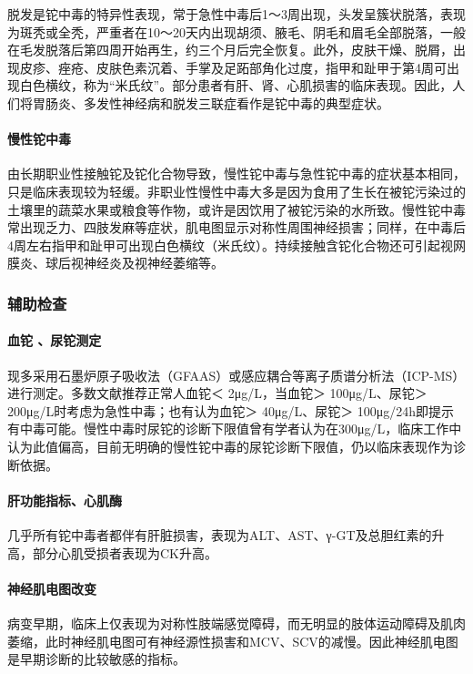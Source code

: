 脱发是铊中毒的特异性表现，常于急性中毒后1～3周出现，头发呈簇状脱落，表现为斑秃或全秃，严重者在10～20天内出现胡须、腋毛、阴毛和眉毛全部脱落，一般在毛发脱落后第四周开始再生，约三个月后完全恢复。此外，皮肤干燥、脱屑，出现皮疹、痤疮、皮肤色素沉着、手掌及足跖部角化过度，指甲和趾甲于第4周可出现白色横纹，称为“米氏纹”。部分患者有肝、肾、心肌损害的临床表现。因此，人们将胃肠炎、多发性神经病和脱发三联症看作是铊中毒的典型症状。

\paragraph{慢性铊中毒}

由长期职业性接触铊及铊化合物导致，慢性铊中毒与急性铊中毒的症状基本相同，只是临床表现较为轻缓。非职业性慢性中毒大多是因为食用了生长在被铊污染过的土壤里的蔬菜水果或粮食等作物，或许是因饮用了被铊污染的水所致。慢性铊中毒常出现乏力、四肢发麻等症状，肌电图显示对称性周围神经损害；同样，在中毒后4周左右指甲和趾甲可出现白色横纹（米氏纹）。持续接触含铊化合物还可引起视网膜炎、球后视神经炎及视神经萎缩等。

\subsubsection{辅助检查}

\paragraph{血铊 、尿铊测定}

现多采用石墨炉原子吸收法（GFAAS）或感应耦合等离子质谱分析法（ICP-MS）进行测定。多数文献推荐正常人血铊＜
2μg/L，当血铊＞ 100μg/L、尿铊＞ 200μg/L时考虑为急性中毒；也有认为血铊＞
40μg/L、尿铊＞
100μg/24h即提示有中毒可能。慢性中毒时尿铊的诊断下限值曾有学者认为在300μg/L，临床工作中认为此值偏高，目前无明确的慢性铊中毒的尿铊诊断下限值，仍以临床表现作为诊断依据。

\paragraph{肝功能指标、心肌酶}

几乎所有铊中毒者都伴有肝脏损害，表现为ALT、AST、γ-GT及总胆红素的升高，部分心肌受损者表现为CK升高。

\paragraph{神经肌电图改变}

病变早期，临床上仅表现为对称性肢端感觉障碍，而无明显的肢体运动障碍及肌肉萎缩，此时神经肌电图可有神经源性损害和MCV、SCV的减慢。因此神经肌电图是早期诊断的比较敏感的指标。

